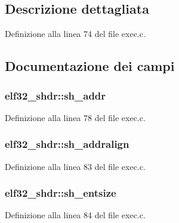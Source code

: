 \subsection{Descrizione dettagliata}


Definizione alla linea 74 del file exec.\+c.



\subsection{Documentazione dei campi}
\hypertarget{structelf32__shdr_a7054ce2ce815d205d451bfe7ce2e145e}{
\subsubsection[{sh\+\_\+addr}]{ elf32\+\_\+shdr\+::sh\+\_\+addr}}\label{structelf32__shdr_a7054ce2ce815d205d451bfe7ce2e145e}


Definizione alla linea 78 del file exec.\+c.

\hypertarget{structelf32__shdr_a74275f49dbae08127832dc1061ed24ab}{
\subsubsection[{sh\+\_\+addralign}]{ elf32\+\_\+shdr\+::sh\+\_\+addralign}}\label{structelf32__shdr_a74275f49dbae08127832dc1061ed24ab}


Definizione alla linea 83 del file exec.\+c.

\hypertarget{structelf32__shdr_a0360b455d1586deda50df0adaa7a87e0}{
\subsubsection[{sh\+\_\+entsize}]{ elf32\+\_\+shdr\+::sh\+\_\+entsize}}\label{structelf32__shdr_a0360b455d1586deda50df0adaa7a87e0}


Definizione alla linea 84 del file exec.\+c.

